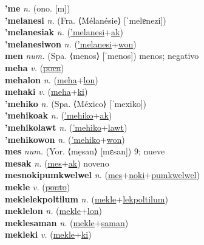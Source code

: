\textbf{'me} \textit{n.} (ono. [m])
 \label{'me} \\
\textbf{'melanesi} \textit{n.} (Fra. ⟨Mélanésie⟩ [ˈmelɐnezi])
 \label{'melanesi} \\
\textbf{'melanesiak} \textit{n.} (\hyperref['melanesi]{'melanesi}+\hyperref[ak]{ak})
 \label{'melanesiak} \\
\textbf{'melanesiwon} \textit{n.} (\hyperref['melanesi]{'melanesi}+\hyperref[won]{won})
 \label{'melanesiwon} \\
\textbf{men} \textit{num.} (Spa. ⟨menos⟩ [ˈmenos])
menos; negativo \label{men} \\
\textbf{meha} \textit{v.} (\hyperref[poca]{\sout{poca}})
 \label{meha} \\
\textbf{mehalon} \textit{n.} (\hyperref[meha]{meha}+\hyperref[lon]{lon})
 \label{mehalon} \\
\textbf{mehaki} \textit{v.} (\hyperref[meha]{meha}+\hyperref[ki]{ki})
 \label{mehaki} \\
\textbf{'mehiko} \textit{n.} (Spa. ⟨México⟩ [ˈmexiko])
 \label{'mehiko} \\
\textbf{'mehikoak} \textit{n.} (\hyperref['mehiko]{'mehiko}+\hyperref[ak]{ak})
 \label{'mehikoak} \\
\textbf{'mehikolawt} \textit{n.} (\hyperref['mehiko]{'mehiko}+\hyperref[lawt]{lawt})
 \label{'mehikolawt} \\
\textbf{'mehikowon} \textit{n.} (\hyperref['mehiko]{'mehiko}+\hyperref[won]{won})
 \label{'mehikowon} \\
\textbf{mes} \textit{num.} (Yor. ⟨mẹsan⟩ [mɛsan])
9; nueve \label{mes} \\
\textbf{mesak} \textit{n.} (\hyperref[mes]{mes}+\hyperref[ak]{ak})
noveno \label{mesak} \\
\textbf{mesnokipumkwelwel} \textit{n.} (\hyperref[mes]{mes}+\hyperref[noki]{noki}+\hyperref[pumkwelwel]{pumkwelwel})
 \label{mesnokipumkwelwel} \\
\textbf{mekle} \textit{v.} (\hyperref[ponto]{\sout{ponto}})
 \label{mekle} \\
\textbf{meklelekpoltilum} \textit{n.} (\hyperref[mekle]{mekle}+\hyperref[lekpoltilum]{lekpoltilum})
 \label{meklelekpoltilum} \\
\textbf{meklelon} \textit{n.} (\hyperref[mekle]{mekle}+\hyperref[lon]{lon})
 \label{meklelon} \\
\textbf{meklesaman} \textit{n.} (\hyperref[mekle]{mekle}+\hyperref[saman]{saman})
 \label{meklesaman} \\
\textbf{mekleki} \textit{v.} (\hyperref[mekle]{mekle}+\hyperref[ki]{ki})
